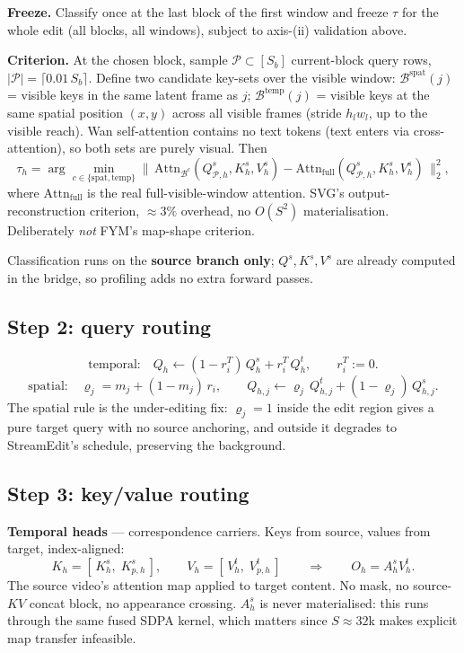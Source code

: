 \documentclass{article}
\begin{document}
\textbf{Freeze.} Classify once at the last block of the first window and freeze
$\tau$ for the whole edit (all blocks, all windows), subject to axis-(ii)
validation above.

\textbf{Criterion.} At the chosen block, sample $\mathcal{P} \subset [S_b]$
current-block query rows, $|\mathcal{P}| = \lceil 0.01\,S_b \rceil$. Define two
candidate key-sets over the visible window: $\mathcal{B}^{\mathrm{spat}}(j)$ =
visible keys in the same latent frame as $j$; $\mathcal{B}^{\mathrm{temp}}(j)$ =
visible keys at the same spatial position $(x,y)$ across all visible frames
(stride $h_l w_l$, up to the visible reach). Wan self-attention contains no
text tokens (text enters via cross-attention), so both sets are purely visual.
Then
\[
  \tau_h = \arg\min_{c \in \{\mathrm{spat},\mathrm{temp}\}}
  \big\|\,\mathrm{Attn}_{\mathcal{B}^{c}}(Q^{s}_{\mathcal{P},h}, K^{s}_h, V^{s}_h)
       - \mathrm{Attn}_{\mathrm{full}}(Q^{s}_{\mathcal{P},h}, K^{s}_h, V^{s}_h)\,\big\|_2^2 ,
\]
where $\mathrm{Attn}_{\mathrm{full}}$ is the real full-visible-window attention.
SVG's output-reconstruction criterion, $\approx 3\%$ overhead, no $O(S^2)$
materialisation. Deliberately \emph{not} FYM's map-shape criterion.

Classification runs on the \textbf{source branch only}; $Q^s, K^s, V^s$ are
already computed in the bridge, so profiling adds no extra forward passes.

\subsection{Step 2: query routing}

\[
  \text{temporal:}\quad Q_h \leftarrow (1-r^{T}_i)\,Q^{s}_h + r^{T}_i\,Q^{t}_h,
  \qquad r^{T}_i := 0 .
\]
\[
  \text{spatial:}\quad \varrho_j = m_j + (1-m_j)\,r_i,
  \qquad Q_{h,j} \leftarrow \varrho_j\,Q^{t}_{h,j} + (1-\varrho_j)\,Q^{s}_{h,j}.
\]
The spatial rule is the under-editing fix: $\varrho_j = 1$ inside the edit
region gives a pure target query with no source anchoring, and outside it
degrades to StreamEdit's schedule, preserving the background.

\subsection{Step 3: key/value routing}

\textbf{Temporal heads} --- correspondence carriers. Keys from source, values
from target, index-aligned:
\[
  K_h = [\,K^{s}_h,\; K^{s}_{p,h}\,], \qquad
  V_h = [\,V^{t}_h,\; V^{t}_{p,h}\,]
  \qquad\Longrightarrow\qquad
  O_h = A^{s}_h V^{t}_h .
\]
The source video's attention map applied to target content. No mask, no
source-$KV$ concat block, no appearance crossing. $A^{s}_h$ is never
materialised: this runs through the same fused SDPA kernel, which matters since
$S \approx 32$k makes explicit map transfer infeasible.
\end{document}
